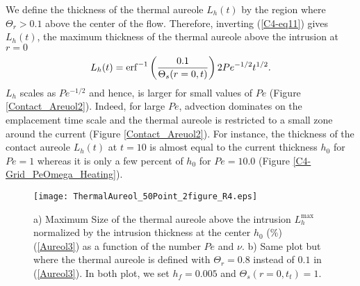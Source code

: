 We define the thickness of the  thermal aureole $L_h(t)$ by the region
where  $\Theta_r>0.1$  above  the  center  of  the  flow.   Therefore,
inverting (\ref{C4-eq11}) gives $L_h(t)$, the maximum thickness of the
thermal aureole above the intrusion at $r=0$
\begin{equation}
  L_h(t)                                                           =
  \operatorname{erf}^{-1}\left(\frac{0.1}{\Theta_s(r=0,t)}\right)2Pe^{-1/2}t^{1/2}.
  \label{Aureol}
\end{equation}
$L_h$ scales as  $Pe^{-1/2}$ and hence, is larger for  small values of
$Pe$ (Figure \ref{Contact_Areuol2}). Indeed, for large $Pe$, advection
dominates on  the emplacement  time scale and  the thermal  aureole is
restricted   to   a   small    zone   around   the   current   (Figure
\ref{Contact_Areuol2}).  For  instance, the  thickness of  the contact
aureole $L_h(t)$  at $t=10$ is  almost equal to the  current thickness
$h_0$  for $Pe=1$  whereas  it is  only  a few  percent  of $h_0$  for
$Pe=10.0$ (Figure \ref{C4-Grid_PeOmega_Heating}).
\begin{figure}[h!]
  \begin{center}
    \graphicspath{ {/Users/thorey/Documents/These/Projet/Refroidissement/Skin_Model/Figure/Figure_Heating/} }
    \texttt{[image: ThermalAureol\_50Point\_2figure\_R4.eps]}
    \caption{a)  Maximum  Size  of   the  thermal  aureole  above  the
      intrusion   $L_h^{\text{max}}$  normalized   by  the   intrusion
      thickness  at  the  center  $h_0$ ($\%$)  (\ref{Aureol3})  as  a
      function of the  number $Pe$ and $\nu$.  b) Same  plot but where
      the thermal  aureole is  defined with $\Theta_r=0.8$  instead of
      $0.1$ in (\ref{Aureol3}).  In both  plot, we set $h_f=0.005$ and
      $\Theta_s(r=0,t_{t})=1$.}
    \label{PhaseHeatingContact}
  \end{center}
\end{figure}

